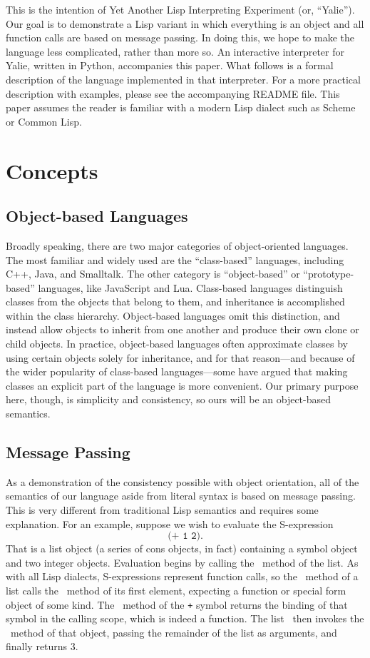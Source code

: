 \documentclass[twocolumn]{article}
\begin{document}
This is the intention of Yet Another Lisp Interpreting Experiment (or,
``Yalie''). Our goal is to demonstrate a Lisp variant in which
everything is an object and all function calls are based on message
passing. In doing this, we hope to make the language less complicated,
rather than more so. An interactive interpreter for Yalie, written in
Python, accompanies this paper. What follows is a formal description
of the language implemented in that interpreter.  For a more practical
description with examples, please see the accompanying README
file. This paper assumes the reader is familiar with a modern Lisp
dialect such as Scheme or Common Lisp.

\section*{Concepts}
\subsection*{Object-based Languages}
Broadly speaking, there are two major categories of object-oriented
languages\cite{Abadi}. The most familiar and widely used are the
``class-based'' languages, including C++, Java, and Smalltalk. The
other category is ``object-based'' or ``prototype-based'' languages,
like JavaScript and Lua. Class-based languages distinguish classes
from the objects that belong to them, and inheritance is accomplished
within the class hierarchy. Object-based languages omit this
distinction, and instead allow objects to inherit from one another and
produce their own clone or child objects. In practice, object-based
languages often approximate classes by using certain objects solely
for inheritance, and for that reason---and because of the wider
popularity of class-based languages---some have argued that making
classes an explicit part of the language is more
convenient\cite{Bruce}. Our primary purpose here, though, is
simplicity and consistency, so ours will be an object-based semantics.

\subsection*{Message Passing}
As a demonstration of the consistency possible with object
orientation, all of the semantics of our language aside from literal
syntax is based on message passing. This is very different from
traditional Lisp semantics and requires some explanation. For an
example, suppose we wish to evaluate the S-expression
\[ \texttt{(+ 1 2)}. \] That is a list object (a series of cons
objects, in fact) containing a symbol object and two integer
objects. Evaluation begins by calling the \eval\ method of the list. As
with all Lisp dialects, S-expressions represent function calls, so the
\eval\ method of a list calls the \eval\ method of its first element,
expecting a function or special form object of some kind. The \eval\
method of the \texttt{+} symbol returns the binding of that symbol in
the calling scope, which is indeed a function. The list \eval\ then
invokes the \call\ method of that object, passing the remainder of the
list as arguments, and finally returns $3$.
\end{document}
